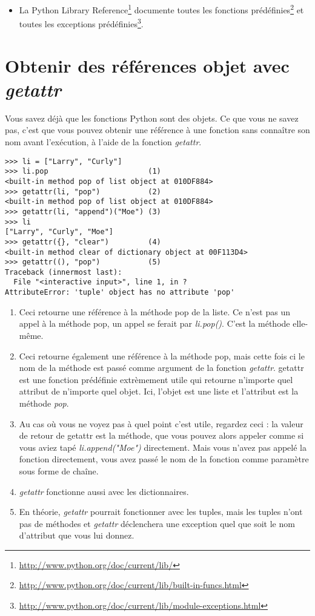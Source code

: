 \begin{itemize}
\item La Python Library Reference\footnote{\url{http://www.python.org/doc/current/lib/}} documente toutes les fonctions prédéfinies\footnote{\url{http://www.python.org/doc/current/lib/built-in-funcs.html}} et toutes les exceptions prédéfinies\footnote{\url{http://www.python.org/doc/current/lib/module-exceptions.html}}.
\end{itemize}

\section{Obtenir des références objet avec \emph{getattr}}

Vous savez déjà que les fonctions Python sont des objets. Ce que vous ne savez pas, c’est que vous pouvez obtenir une référence à une fonction sans connaître son nom avant l’exécution, à l’aide de la fonction \emph{getattr}.

\begin{example}
\begin{lstlisting}
>>> li = ["Larry", "Curly"]
>>> li.pop                       (1)
<built-in method pop of list object at 010DF884>
>>> getattr(li, "pop")           (2)
<built-in method pop of list object at 010DF884>
>>> getattr(li, "append")("Moe") (3)
>>> li
["Larry", "Curly", "Moe"]
>>> getattr({}, "clear")         (4)
<built-in method clear of dictionary object at 00F113D4>
>>> getattr((), "pop")           (5)
Traceback (innermost last):
  File "<interactive input>", line 1, in ?
AttributeError: 'tuple' object has no attribute 'pop'
\end{lstlisting}
\end{example}

\begin{enumerate}
    \item{Ceci retourne une référence à la méthode pop de la liste. Ce n’est pas un appel à la méthode pop, un appel se ferait par \emph{li.pop()}. C’est la méthode elle-même.}
    \item{Ceci retourne également une référence à la méthode pop, mais cette fois ci le nom de la méthode est passé comme argument de la fonction \emph{getattr}. getattr est une fonction prédéfinie extrèmement utile qui retourne n’importe quel attribut de n’importe quel objet. Ici, l’objet est une liste et l’attribut est la méthode \emph{pop}.}
    \item{Au cas où vous ne voyez pas à quel point c’est utile, regardez ceci : la valeur de retour de getattr est la méthode, que vous pouvez alors appeler comme si vous aviez tapé \emph{li.append("Moe")} directement. Mais vous n’avez pas appelé la fonction directement, vous avez passé le nom de la fonction comme paramètre sous forme de chaîne.}
    \item{\emph{getattr} fonctionne aussi avec les dictionnaires.}
    \item{En théorie, \emph{getattr} pourrait fonctionner avec les tuples, mais les tuples n’ont pas de méthodes et \emph{getattr} déclenchera une exception quel que soit le nom d’attribut que vous lui donnez.}
\end{enumerate}

